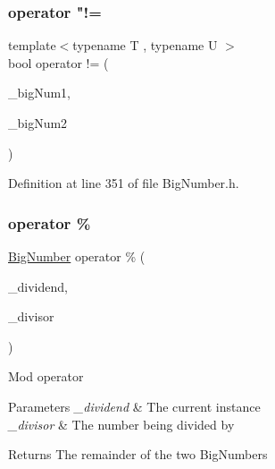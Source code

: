 \subsubsection{\texorpdfstring{operator "!=}{operator !=}\hspace{0.1cm}{\footnotesize\ttfamily [2/2]}}
{\footnotesize\ttfamily template$<$typename T , typename U $>$ \\
bool operator != (\begin{DoxyParamCaption}\item[{const T \&}]{\+\_\+big\+Num1,  }\item[{const U \&}]{\+\_\+big\+Num2 }\end{DoxyParamCaption})\hspace{0.3cm}{\ttfamily [friend]}}



Definition at line 351 of file Big\+Number.\+h.

\mbox{\label{class_big_nums_1_1_big_number_a22a2ab555ef01a5b6cdc31751156e4dd}} 
\subsubsection{\texorpdfstring{operator \%}{operator \%}\hspace{0.1cm}{\footnotesize\ttfamily [1/2]}}
{\footnotesize\ttfamily \mbox{\hyperlink{class_big_nums_1_1_big_number}{Big\+Number}} operator \% (\begin{DoxyParamCaption}\item[{\mbox{\hyperlink{class_big_nums_1_1_big_number}{Big\+Number}}}]{\+\_\+dividend,  }\item[{const \mbox{\hyperlink{class_big_nums_1_1_big_number}{Big\+Number}} \&}]{\+\_\+divisor }\end{DoxyParamCaption})\hspace{0.3cm}{\ttfamily [friend]}}

Mod operator 
\begin{DoxyParams}{Parameters}
{\em \+\_\+dividend} & The current instance \\
\hline
{\em \+\_\+divisor} & The number being divided by \\
\hline
\end{DoxyParams}
\begin{DoxyReturn}{Returns}
The remainder of the two Big\+Numbers 
\end{DoxyReturn}



